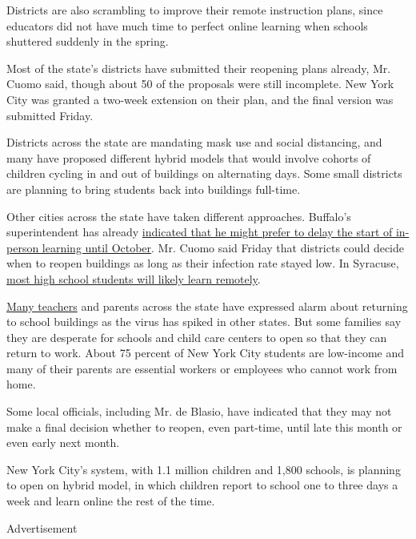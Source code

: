 Districts are also scrambling to improve their remote instruction plans,
since educators did not have much time to perfect online learning when
schools shuttered suddenly in the spring.

Most of the state's districts have submitted their reopening plans
already, Mr. Cuomo said, though about 50 of the proposals were still
incomplete. New York City was granted a two-week extension on their
plan, and the final version was submitted Friday.

Districts across the state are mandating mask use and social distancing,
and many have proposed different hybrid models that would involve
cohorts of children cycling in and out of buildings on alternating days.
Some small districts are planning to bring students back into buildings
full-time.

Other cities across the state have taken different approaches. Buffalo's
superintendent has already
\href{https://www.wgrz.com/article/news/education/state-to-buffalo-schools-180-day-requirement-for-student-instruction-stands/71-75983566-9d86-4b01-8463-621ce0f86d0b}{indicated
that he might prefer to delay the start of in-person learning until
October}. Mr. Cuomo said Friday that districts could decide when to
reopen buildings as long as their infection rate stayed low. In
Syracuse,
\href{https://www.syracuse.com/schools/2020/08/central-ny-school-reopening-plans-are-finally-in-none-are-the-same.html}{most
high school students will likely learn remotely}.

\href{https://www.nytimes.com/2020/07/29/us/teacher-union-school-reopening-coronavirus.html}{Many
teachers} and parents across the state have expressed alarm about
returning to school buildings as the virus has spiked in other states.
But some families say they are desperate for schools and child care
centers to open so that they can return to work. About 75 percent of New
York City students are low-income and many of their parents are
essential workers or employees who cannot work from home.

Some local officials, including Mr. de Blasio, have indicated that they
may not make a final decision whether to reopen, even part-time, until
late this month or even early next month.

New York City's system, with 1.1 million children and 1,800 schools, is
planning to open on hybrid model, in which children report to school one
to three days a week and learn online the rest of the time.

Advertisement

